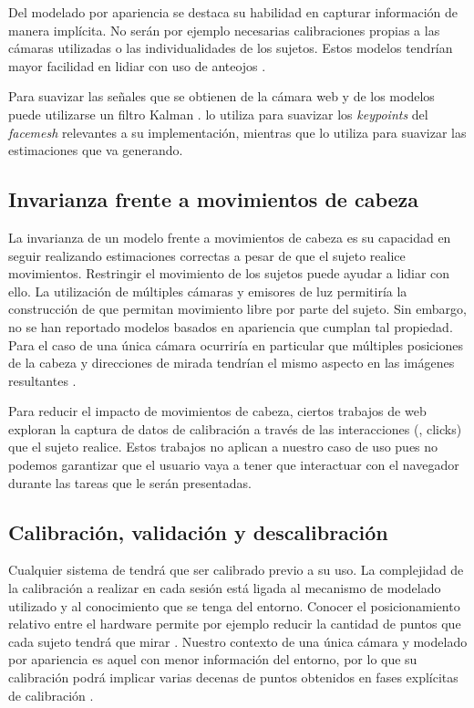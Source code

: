 Del modelado por apariencia se destaca su habilidad en capturar información de
manera implícita.
No serán por ejemplo necesarias calibraciones propias a las cámaras utilizadas
o las individualidades de los sujetos.
Estos modelos tendrían mayor facilidad en lidiar con uso de anteojos
\cite{hansen_2009_eye_of_the_beholder}.

Para suavizar las señales que se obtienen de la cámara web y de los modelos
puede utilizarse un filtro Kalman \cite{welch_1995_kalman_filter}.
\turkergaze lo utiliza para suavizar los \textit{keypoints} del
\textit{facemesh} relevantes a su implementación, mientras que \webgazer lo
utiliza para suavizar las estimaciones que va generando.

\subsection{Invarianza frente a movimientos de cabeza}

La invarianza de un modelo frente a movimientos de cabeza es su capacidad en
seguir realizando estimaciones correctas a pesar de que el sujeto realice
movimientos.
Restringir el movimiento de los sujetos puede ayudar a lidiar con ello.
La utilización de múltiples cámaras y emisores de luz permitiría la
construcción de \eyetrackers que permitan movimiento libre por parte del
sujeto.
Sin embargo, no se han reportado modelos basados en apariencia que cumplan tal
propiedad.
Para el caso de una única cámara ocurriría en particular que múltiples
posiciones de la cabeza y direcciones de mirada tendrían el mismo aspecto en
las imágenes resultantes \cite{hansen_2009_eye_of_the_beholder}.

Para reducir el impacto de movimientos de cabeza, ciertos trabajos de
\eyetracking web \cite{papoutsaki_2016_webgazer, huang_2016_pace} exploran la
captura de datos de calibración a través de las interacciones (\eg, clicks)
que el sujeto realice.
Estos trabajos no aplican a nuestro caso de uso pues no podemos garantizar que
el usuario vaya a tener que interactuar con el navegador durante las tareas que
le serán presentadas.

\subsection{Calibración, validación y descalibración}
\label{section:intro:calibration}

Cualquier sistema de \eyetracking tendrá que ser calibrado previo a su uso.
La complejidad de la calibración a realizar en cada sesión está ligada al
mecanismo de modelado utilizado y al conocimiento que se tenga del entorno.
Conocer el posicionamiento relativo entre el hardware permite por ejemplo
reducir la cantidad de puntos que cada sujeto tendrá que mirar
\cite{hansen_2009_eye_of_the_beholder}.
Nuestro contexto de una única cámara y modelado por apariencia es aquel con
menor información del entorno, por lo que su calibración podrá implicar varias
decenas de puntos obtenidos en fases explícitas de calibración
\cite{xu_2015_turker_gaze}.

